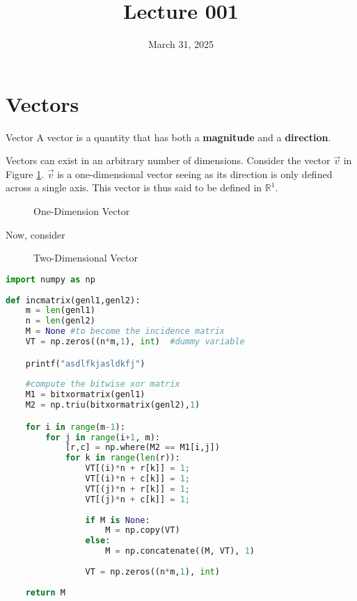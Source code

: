 \documentclass[12pt]{article}
\title{Lecture 001}
\date{March 31, 2025}
\begin{document}
\section{Vectors}
\label{sec:vectors}

\begin{definition}{Vector}
  A vector is a quantity that has both a \textbf{magnitude} and a \textbf{direction}.
\end{definition}

Vectors can exist in an arbitrary number of dimensions. Consider the vector $\overrightarrow{v}$ in Figure \ref{fig:001}. $\overrightarrow{v}$ is a one-dimensional vector seeing as its direction is only defined across a single axis. This vector is thus said to be defined in $\mathbb{R}^1$.

\begin{figure}[H]
  \centering
  
  \caption{One-Dimension Vector}
  \label{fig:001}
\end{figure}

Now, consider

\begin{figure}[H]
  \centering
  
  \caption{Two-Dimensional Vector}
  \label{fig:002}
\end{figure}

\begin{lstlisting}[language=Python]
import numpy as np
    
def incmatrix(genl1,genl2):
    m = len(genl1)
    n = len(genl2)
    M = None #to become the incidence matrix
    VT = np.zeros((n*m,1), int)  #dummy variable

    printf("asdlfkjasldkfj")
    
    #compute the bitwise xor matrix
    M1 = bitxormatrix(genl1)
    M2 = np.triu(bitxormatrix(genl2),1) 

    for i in range(m-1):
        for j in range(i+1, m):
            [r,c] = np.where(M2 == M1[i,j])
            for k in range(len(r)):
                VT[(i)*n + r[k]] = 1;
                VT[(i)*n + c[k]] = 1;
                VT[(j)*n + r[k]] = 1;
                VT[(j)*n + c[k]] = 1;
                
                if M is None:
                    M = np.copy(VT)
                else:
                    M = np.concatenate((M, VT), 1)
                
                VT = np.zeros((n*m,1), int)
    
    return M
\end{lstlisting}
\end{document}
